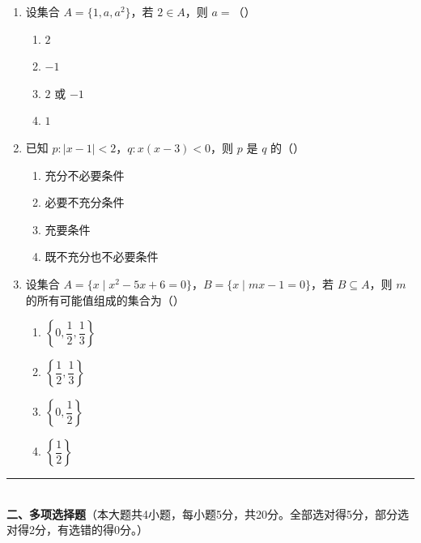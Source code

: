 \documentclass[12pt, a4paper]{ctexart}
\begin{document}
\begin{enumerate}
\item 设集合 $A=\{1,a,a^2\}$，若 $2\in A$，则 $a=$（\quad）
  \begin{enumerate}[label=\Alph*., itemsep=0pt]
    \item $2$ \quad \item $-1$ \quad \item $2$ 或 $-1$ \quad \item $1$
  \end{enumerate}

\item 已知 $p: |x-1|<2$，$q: x(x-3)<0$，则 $p$ 是 $q$ 的（\quad）
  \begin{enumerate}[label=\Alph*., itemsep=0pt]
    \item 充分不必要条件 \quad \item 必要不充分条件
    \item 充要条件 \quad \item 既不充分也不必要条件
  \end{enumerate}

\item 设集合 $A=\{x\mid x^2-5x+6=0\}$，$B=\{x\mid mx-1=0\}$，若 $B\subseteq A$，则 $m$ 的所有可能值组成的集合为（\quad）
  \begin{enumerate}[label=\Alph*., itemsep=0pt]
    \item $\left\{0,\dfrac{1}{2},\dfrac{1}{3}\right\}$ \quad \item $\left\{\dfrac{1}{2},\dfrac{1}{3}\right\}$
    \item $\left\{0,\dfrac{1}{2}\right\}$ \quad \item $\left\{\dfrac{1}{2}\right\}$
  \end{enumerate}
\end{enumerate}

\vspace{6pt}

\noindent\rule{\textwidth}{0.4pt}\\[2pt]
{\large\bfseries 二、多项选择题}（本大题共4小题，每小题5分，共20分。全部选对得5分，部分选对得2分，有选错的得0分。）

\vspace{6pt}
\end{document}
